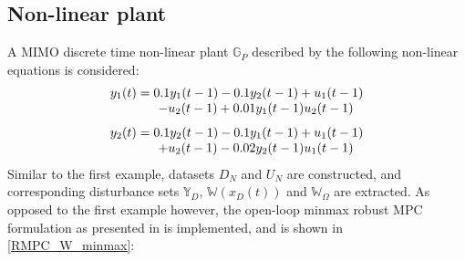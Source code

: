 \documentclass[letterpaper, 10 pt, conference]{ieeeconf}  %
\begin{document}
\subsection{Non-linear plant}
A MIMO discrete time non-linear plant $\mathbb{G}_P$ described by the following non-linear equations is considered:
\begin{equation}
\small
\begin{matrix}
y_1(t) = 0.1y_1(t-1)-0.1y_2(t-1)+u_1(t-1)\\\hspace{30pt}-u_2(t-1)+0.01y_1(t-1)u_2(t-1) \\ \vspace{-5pt}\\
y_2(t) = 0.1y_2(t-1)-0.1y_1(t-1)+u_1(t-1)\\\hspace{30pt} +u_2(t-1)-0.02y_2(t-1)u_1(t-1) \\
\end{matrix}
\end{equation}
Similar to the first example, datasets $D_N$ and $U_N$ are constructed, and corresponding disturbance sets $\mathbb{Y}_D$, $\mathbb{W}(x_D(t))$ and $\mathbb{W}_\Omega$ are extracted. As opposed to the first example however, the  open-loop minmax robust MPC formulation as presented in \cite{Lofberg:2003} is implemented, and is shown in \eqref{RMPC_W_minmax}:
\end{document}
